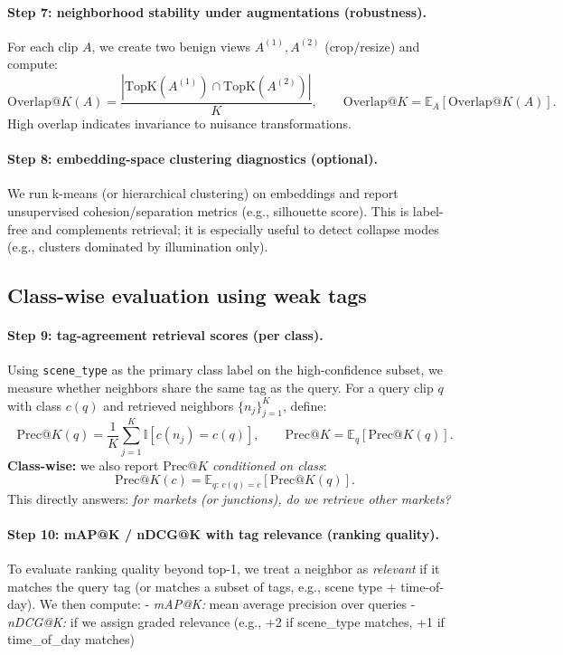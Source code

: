 \paragraph{Step 7: neighborhood stability under augmentations (robustness).}
For each clip $A$, we create two benign views $A^{(1)}, A^{(2)}$ (crop/resize) and compute:
\[
\text{Overlap@}K(A)=\frac{\left|\text{TopK}(A^{(1)})\cap \text{TopK}(A^{(2)})\right|}{K},
\qquad
\text{Overlap@}K=\mathbb{E}_A[\text{Overlap@}K(A)].
\]
High overlap indicates invariance to nuisance transformations.

\paragraph{Step 8: embedding-space clustering diagnostics (optional).}
We run k-means (or hierarchical clustering) on embeddings and report unsupervised cohesion/separation metrics (e.g., silhouette score). This is label-free and complements retrieval; it is especially useful to detect collapse modes (e.g., clusters dominated by illumination only).

\subsection{Class-wise evaluation using weak tags}\label{sec:vjepa_eval_classwise}

\paragraph{Step 9: tag-agreement retrieval scores (per class).}
Using \texttt{scene\_type} as the primary class label on the high-confidence subset, we measure whether neighbors share the same tag as the query. For a query clip $q$ with class $c(q)$ and retrieved neighbors $\{n_j\}_{j=1}^K$, define:
\[
\text{Prec@}K(q)=\frac{1}{K}\sum_{j=1}^K \mathbb{I}\left[c(n_j)=c(q)\right],
\qquad
\text{Prec@}K=\mathbb{E}_q[\text{Prec@}K(q)].
\]
\textbf{Class-wise:} we also report $\text{Prec@}K$ \emph{conditioned on class}:
\[
\text{Prec@}K(c)=\mathbb{E}_{q:\,c(q)=c}[\text{Prec@}K(q)].
\]
This directly answers: \emph{for markets (or junctions), do we retrieve other markets?}

\paragraph{Step 10: mAP@K / nDCG@K with tag relevance (ranking quality).}
To evaluate ranking quality beyond top-1, we treat a neighbor as \emph{relevant} if it matches the query tag (or matches a subset of tags, e.g., scene type + time-of-day). We then compute:
- \emph{mAP@K:} mean average precision over queries
- \emph{nDCG@K:} if we assign graded relevance (e.g., +2 if scene\_type matches, +1 if time\_of\_day matches)

